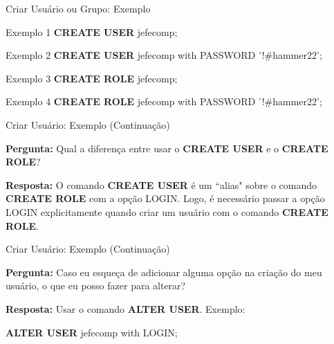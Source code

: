 \documentclass[xcolor=x11names,compress]{beamer}
\begin{document}
\begin{frame}{Criar Usuário ou Grupo: Exemplo}

\begin{alertblock}{Exemplo 1}
\textbf{CREATE USER} jefecomp;
\end{alertblock}

\begin{alertblock}{Exemplo 2}
\textbf{CREATE USER} jefecomp with PASSWORD '!\#hammer22';
\end{alertblock}

\begin{alertblock}{Exemplo 3}
\textbf{CREATE ROLE} jefecomp;
\end{alertblock}

\begin{alertblock}{Exemplo 4}
\textbf{CREATE ROLE} jefecomp with PASSWORD '!\#hammer22';
\end{alertblock}

\end{frame}

\begin{frame}{Criar Usuário: Exemplo (Continuação)}
\begin{alertblock}{\textbf{Pergunta:}}
Qual a diferença entre usar o \textbf{CREATE USER} e o \textbf{CREATE ROLE}?
\end{alertblock}

\pause

\begin{alertblock}{\textbf{Resposta:}}
O comando \textbf{CREATE USER} é um ``alias" sobre o comando \textbf{CREATE ROLE} com a opção LOGIN. Logo, é necessário passar a opção LOGIN explicitamente quando criar um usuário com o comando \textbf{CREATE ROLE}.
\end{alertblock}

\end{frame}

\begin{frame}{Criar Usuário: Exemplo (Continuação)}
\begin{alertblock}{\textbf{Pergunta:}}
Caso eu esqueça de adicionar alguma opção na criação do meu usuário, o que eu posso fazer para alterar?
\end{alertblock}

\pause

\begin{alertblock}{\textbf{Resposta:}}
Usar o comando \textbf{ALTER USER}. Exemplo:

\textbf{ALTER USER} jefecomp with LOGIN;

\end{alertblock}

\end{frame}
\end{document}
